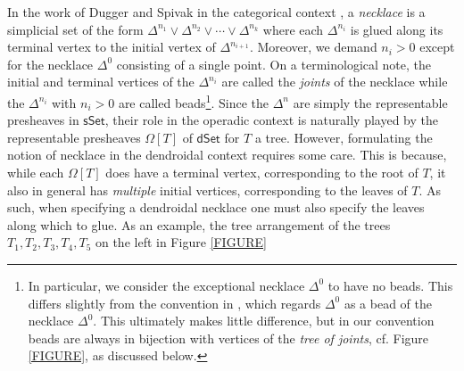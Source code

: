 \documentclass[a4paper,10pt
,draft
]{article}%
\numberwithin{equation}{section}
\numberwithin{figure}{section}
\theoremstyle{definition} %
\newcommand{\1}{\ensuremath{\mathbbm 1}}%
\begin{document}
In the work of Dugger and Spivak in the categorical context
\cite{DS11},
a \emph{necklace} is a simplicial set of the form
$\Delta^{n_1} \vee 
\Delta^{n_2} \vee \cdots \vee
\Delta^{n_k}$
where each $\Delta^{n_i}$ is glued along its terminal vertex to the initial vertex of $\Delta^{n_{i+1}}$.
Moreover, we demand $n_i > 0$
except for the necklace $\Delta^0$ consisting of a single point.
On a terminological note, the initial and terminal vertices of the 
$\Delta^{n_i}$ are called the \emph{joints} of the necklace
while the $\Delta^{n_i}$ with $n_i>0$ are called beads\footnote{In particular, 
we consider the exceptional necklace $\Delta^0$ to
have no beads.  
This differs slightly from the convention in \cite{DS11}, 
which regards $\Delta^0$ as a bead of the necklace $\Delta^0$. 
This ultimately makes little difference,
but in our convention beads are always in bijection with 
vertices of the \emph{tree of joints}, cf. Figure \ref{FIGURE},
as discussed below.}.
Since the $\Delta^n$ are simply the representable presheaves in 
$\mathsf{sSet}$,
their role in the operadic context is naturally played by the 
representable presheaves $\Omega[T]$ of $\mathsf{dSet}$
for $T$ a tree.
However, formulating the notion of necklace in the dendroidal context requires some care.
This is because, while each $\Omega[T]$ does have a terminal vertex, 
corresponding to the root of $T$, 
it also in general has 
\emph{multiple} initial vertices, corresponding to the leaves
of $T$.
As such, when specifying a dendroidal necklace
one must also specify the leaves along which to glue.
As an example, the tree arrangement of the trees
$T_1,T_2,T_3,T_4,T_5$ on the left
in Figure \ref{FIGURE}
\end{document}
